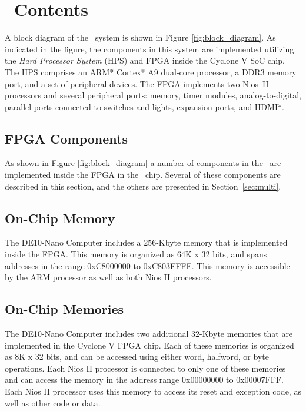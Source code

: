 \section{\systemName~Contents}
A block diagram of the \systemName~system is shown in 
Figure \ref{fig:block_diagram}.  As indicated in the figure, the components in this system 
are implemented utilizing the {\it Hard Processor System} (HPS) and FPGA 
inside the Cyclone\textsuperscript{\textregistered} V SoC chip. The HPS comprises an ARM* Cortex* A9 dual-core 
processor, a DDR3 memory port, and a set of peripheral devices. The FPGA 
implements two Nios\textsuperscript{\textregistered}~II processors and several peripheral ports: memory, timer modules, 
analog-to-digital, parallel ports connected to switches and lights, expansion ports, and HDMI*.




 




\subsection{FPGA Components}
\label{sec:fpga}
As shown in Figure \ref{fig:block_diagram} a number of components in the \systemName~are 
implemented inside the FPGA in the \FPGADeviceFamily~chip.  Several of these components 
are described in this section, and the others are presented in Section~\ref{sec:multi}.




\subsection{On-Chip Memory}

The DE10-Nano Computer includes a 256-Kbyte memory that is implemented inside the FPGA.  This 
memory is organized as 64K {\sf x} 32 bits, and spans addresses in the range 
{\sf 0xC8000000} to {\sf 0xC803FFFF}. This memory is accessible by the ARM processor as
well as both Nios II processors.

\subsection{On-Chip Memories}
The DE10-Nano Computer includes two additional 32-Kbyte memories that are implemented in the
Cyclone V FPGA chip.  Each of these memories is organized as 8K {\sf x} 32 bits, and 
can be accessed using either word, halfword, or byte operations. Each Nios II processor is
connected to only one of these memories and can access the memory in the address range
{\sf 0x00000000} to {\sf 0x00007FFF}. Each Nios II processor uses this memory to access its
reset and exception code, as well as other code or data.

